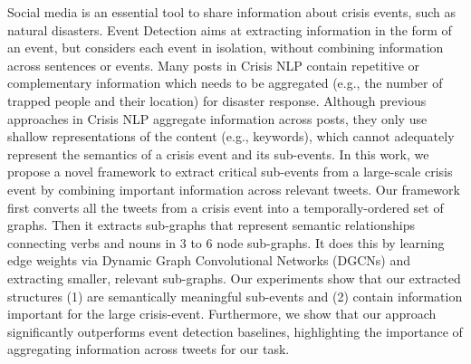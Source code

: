Social media is an essential tool to share information about crisis events, such as natural disasters. Event Detection aims at extracting information in the form of an event, but considers each event in isolation, without combining information across sentences or events. Many posts in Crisis NLP contain repetitive or complementary information which needs to be aggregated (e.g., the number of trapped people and their location) for disaster response. Although previous approaches in Crisis NLP aggregate information across posts, they only use shallow representations of the content (e.g., keywords), which cannot adequately represent the semantics of a crisis event and its sub-events. In this work, we propose a novel framework to extract critical sub-events from a large-scale crisis event by combining important information across relevant tweets. Our framework first converts all the tweets from a crisis event into a temporally-ordered set of graphs. Then it extracts sub-graphs that represent semantic relationships connecting verbs and nouns in 3 to 6 node sub-graphs. It does this by learning edge weights via Dynamic Graph Convolutional Networks (DGCNs) and extracting smaller, relevant sub-graphs. Our experiments show that our extracted structures (1) are semantically meaningful sub-events and (2) contain information important for the large crisis-event. Furthermore, we show that our approach significantly outperforms event detection baselines, highlighting the importance of aggregating information across tweets for our task.

